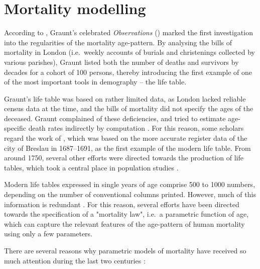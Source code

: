 \documentclass[Thesis]{subfiles}
\begin{document}
\section{Mortality modelling}\label{Sec:Ch1sec2}
According to \cite{coale1983regional}, Graunt's celebrated \textit{Observations} (\citeyear{graunt1662natural}) marked the first investigation into the regularities of the mortality age-pattern. By analysing the bills of mortality in London (i.e.~weekly accounts of burials and christenings collected by various parishes), Graunt listed both the number of deaths and survivors by decades for a cohort of 100 persons, thereby introducing the first example of one of the most important tools in demography -- the life table.  

Graunt's life table was based on rather limited data, as London lacked reliable census data at the time, and the bills of mortality did not specify the ages of the deceased. Graunt complained of these deficiencies, and tried to estimate age-specific death rates indirectly by computation \citep{cole1957sketches}. For this reason, some scholars regard the work of \cite{halley1693estimate}, which was based on the more accurate register data of the city of Breslau in 1687--1691, as the first example of the modern life table. From around 1750, several other efforts were directed towards the production of life tables, which took a central place in population studies \citep{coale1983regional}.

Modern life tables expressed in single years of age comprise 500 to 1000 numbers, depending on the number of conventional columns printed. However, much of this information is redundant \citep{keyfitz1982choice}. For this reason, several efforts have been directed towards the specification of a "mortality law", i.e.~a parametric function of age, which can capture the relevant features of the age-pattern of human mortality using only a few parameters.

There are several reasons why parametric models of mortality have received so much attention during the last two centuries \citep{keyfitz1982choice,congdon1993statistical}:
\end{document}
